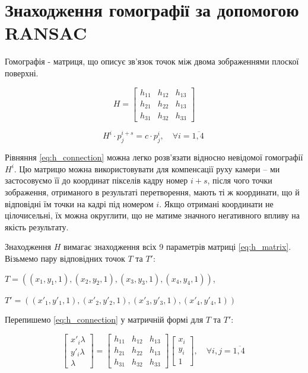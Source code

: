 \section{Знаходження гомографії за допомогою RANSAC}

Гомографія - матриця, що описує зв'язок точок між двома зображеннями плоскої поверхні.

\begin{equation}
    H =
    \begin{bmatrix}
        h_{11} & h_{12} & h_{13} \\
        h_{21} & h_{22} & h_{13} \\
        h_{31} & h_{32} & h_{33}
    \end{bmatrix}
    \label{eq:h_matrix}
\end{equation}

\begin{equation}
    H^{i} \cdot p_{j}^{i + s} = c \cdot p_{j}^{i},\quad\forall i = \overline{1,4\ }
    \label{eq:h_connection}
\end{equation}


Рівняння \ref{eq:h_connection} можна легко розв'язати відносно невідомої гомографії
\(H^{i}\). Цю матрицю можна використовувати для компенсації руху камери
-- ми застосовуємо її до координат пікселів кадру номер \(i + s\), після
чого точки зображення, отриманого в результаті перетворення, мають ті ж
координати, що й відповідні їм точки на кадрі під номером \(i\). Якщо
отримані координати не цілочисельні, їх можна округлити, що не матиме
значного негативного впливу на якість результату.

Знаходження $H$ вимагає знаходження всіх 9 параметрів матриці \ref{eq:h_matrix}.
Візьмемо пару відповідних точок $T$ та $T'$:


$T = ((x_1,y_1,1), (x_2,y_2,1), (x_3,y_3,1), (x_4,y_4,1))$,


$T' = ((x'_1,y'_1,1), (x'_2,y'_2,1), (x'_3,y'_3,1), (x'_4,y'_4,1))$

Перепишемо \ref{eq:h_connection} у матричній формі для $T$ та $T'$:

\begin{equation}
    \begin{bmatrix}
        x'_i\lambda \\
        y'_i\lambda \\
        \lambda
    \end{bmatrix}
    =
    \begin{bmatrix}
        h_{11} & h_{12} & h_{13} \\
        h_{21} & h_{22} & h_{13} \\
        h_{31} & h_{32} & h_{33}
    \end{bmatrix}
    \begin{bmatrix}
        x_i \\
        y_i \\
        1
    \end{bmatrix}
    ,\quad\forall i,j = \overline{1,4\ }
    \label{eq:h_connection2}
\end{equation}

